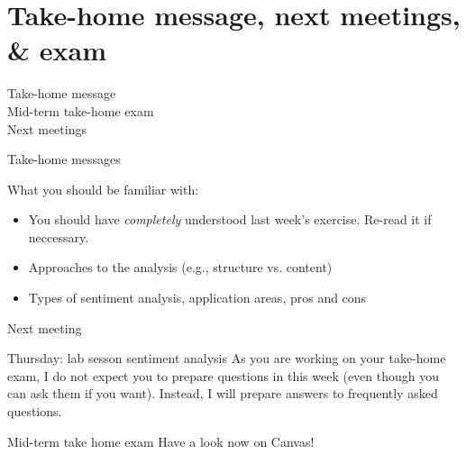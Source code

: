 \documentclass{beamer}
\begin{document}
%
%
%
%




\section[Next meetings]{Take-home message, next meetings, \& exam}
\begin{frame}
Take-home message\\
Mid-term take-home exam\\
Next meetings
\end{frame}



\begin{frame}{Take-home messages}
\begin{block}{What you should be familiar with:}
\begin{itemize}
\item You should have \emph{completely} understood last week's exercise. Re-read it if neccessary.
\item Approaches to the analysis (e.g., structure vs. content)
\item Types of sentiment analysis, application areas, pros and cons
\end{itemize}
\end{block}
\end{frame}


\begin{frame}{Next meeting}
  \begin{block}{Thursday: lab sesson sentiment analysis}
As you are working on your take-home exam, I do not expect you to prepare
questions in this week (even though you can ask them if you want). Instead, I
will prepare answers to frequently asked questions.
\end{block}
\end{frame}


\begin{frame}{Mid-term take home exam}
  Have a look now on Canvas!
\end{frame}
\end{document}
